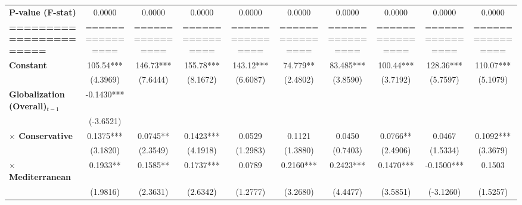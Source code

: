 \begin{center}
\begin{tabular}{lccccccccc}
\textbf{P-value (F-stat)}          &       0.0000       &       0.0000       &       0.0000       &       0.0000       &       0.0000       &       0.0000       &       0.0000       &       0.0000       &       0.0000        \\
\textbf{=======================}   &  ================  &  ================  &  ================  &  ================  &  ================  &  ================  &  ================  &  ================  &  ================   \\
\textbf{Constant}                     &     105.54***      &     146.73***      &     155.78***      &     143.12***      &      74.779**      &     83.485***      &     100.44***      &     128.36***      &     110.07***       \\
\textbf{ }                         &      (4.3969)      &      (7.6444)      &      (8.1672)      &      (6.6087)      &      (2.4802)      &      (3.8590)      &      (3.7192)      &      (5.7597)      &      (5.1079)       \\
\textbf{Globalization (Overall)$_{t-1}$}               &     -0.1430***     &                    &                    &                    &                    &                    &                    &                    &                     \\
\textbf{ }                         &     (-3.6521)      &                    &                    &                    &                    &                    &                    &                    &                     \\
\textbf{$\times$ Conservative}         &     0.1375***      &      0.0745**      &     0.1423***      &       0.0529       &       0.1121       &       0.0450       &      0.0766**      &       0.0467       &     0.1092***       \\
\textbf{ }                         &      (3.1820)      &      (2.3549)      &      (4.1918)      &      (1.2983)      &      (1.3880)      &      (0.7403)      &      (2.4906)      &      (1.5334)      &      (3.3679)       \\
\textbf{$\times$ Mediterranean}        &      0.1933**      &      0.1585**      &     0.1737***      &       0.0789       &     0.2160***      &     0.2423***      &     0.1470***      &     -0.1500***     &       0.1503        \\
\textbf{ }                         &      (1.9816)      &      (2.3631)      &      (2.6342)      &      (1.2777)      &      (3.2680)      &      (4.4477)      &      (3.5851)      &     (-3.1260)      &      (1.5257)       \\

\end{tabular}
\end{center}
